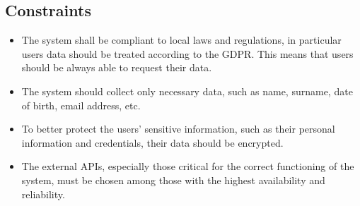 \subsection{Constraints}
\begin{itemize}
      \item The system shall be compliant to local laws and regulations, in particular users data should be treated
            according to the GDPR. This means that users should be always able to request their data.
      \item The system should collect only necessary data, such as name, surname, date of birth, email address, etc.
      \item To better protect the users' sensitive information, such as their personal information and credentials, their data 
            should be encrypted.
      \item The external APIs, especially those critical for the correct functioning of the system, must be chosen among those with 
            the highest availability and reliability.
\end{itemize}
